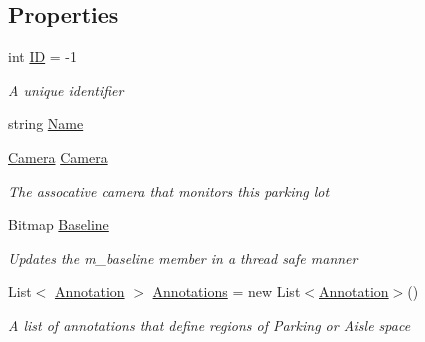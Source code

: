 \subsection*{Properties}
\begin{DoxyCompactItemize}
\item 
int \mbox{\hyperlink{class_eagle_eye_1_1_models_1_1_parking_lot_a947f098cf468fb7856e4b72432318a72}{ID}} = -\/1
\begin{DoxyCompactList}\small\item\em A unique identifier \end{DoxyCompactList}\item 
string \mbox{\hyperlink{class_eagle_eye_1_1_models_1_1_parking_lot_ac2860bd9c6046f6f6b9b10461c0b4619}{Name}}
\item 
\mbox{\hyperlink{class_eagle_eye_1_1_models_1_1_camera}{Camera}} \mbox{\hyperlink{class_eagle_eye_1_1_models_1_1_parking_lot_acc11c12c8ab93ee8fa96894f20df38b3}{Camera}}
\begin{DoxyCompactList}\small\item\em The assocative camera that monitors this parking lot \end{DoxyCompactList}\item 
Bitmap \mbox{\hyperlink{class_eagle_eye_1_1_models_1_1_parking_lot_a1084b858315b2b9c303ec35dca58fe74}{Baseline}}
\begin{DoxyCompactList}\small\item\em Updates the m\+\_\+baseline member in a thread safe manner \end{DoxyCompactList}\item 
List$<$ \mbox{\hyperlink{class_eagle_eye_1_1_models_1_1_annotation}{Annotation}} $>$ \mbox{\hyperlink{class_eagle_eye_1_1_models_1_1_parking_lot_a8a80d92c49b0671de35a6649411a8593}{Annotations}} = new List$<$\mbox{\hyperlink{class_eagle_eye_1_1_models_1_1_annotation}{Annotation}}$>$()
\begin{DoxyCompactList}\small\item\em A list of annotations that define regions of Parking or Aisle space \end{DoxyCompactList}\item 

\end{DoxyCompactItemize}
